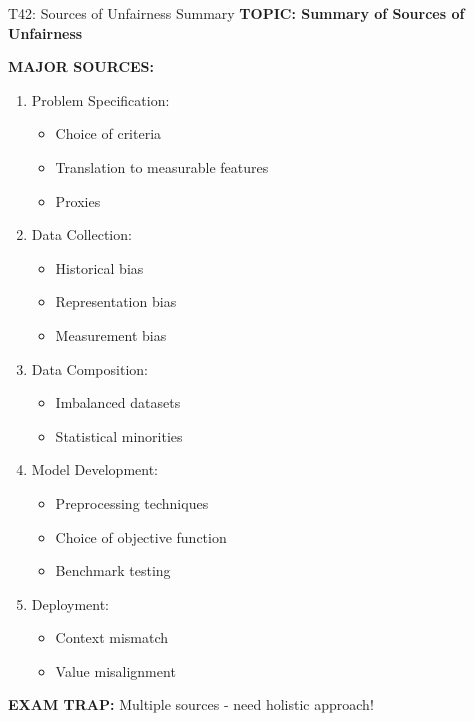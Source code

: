 \documentclass[8pt]{beamer}
\begin{document}
	\begin{frame}{T42: Sources of Unfairness Summary}
		\fontsize{6.5}{7.5}\selectfont
		\textbf{TOPIC: Summary of Sources of Unfairness}
		
		\vspace{0.1cm}
		\textbf{MAJOR SOURCES:}
		\begin{enumerate}
			\item \textcolor{myblue}{Problem Specification:}
			\begin{itemize}
				\item Choice of criteria
				\item Translation to measurable features
				\item Proxies
			\end{itemize}
			\item \textcolor{myblue}{Data Collection:}
			\begin{itemize}
				\item Historical bias
				\item Representation bias
				\item Measurement bias
			\end{itemize}
			\item \textcolor{myblue}{Data Composition:}
			\begin{itemize}
				\item Imbalanced datasets
				\item Statistical minorities
			\end{itemize}
			\item \textcolor{myblue}{Model Development:}
			\begin{itemize}
				\item Preprocessing techniques
				\item Choice of objective function
				\item Benchmark testing
			\end{itemize}
			\item \textcolor{myblue}{Deployment:}
			\begin{itemize}
				\item Context mismatch
				\item Value misalignment
			\end{itemize}
		\end{enumerate}
		
		\textcolor{myred}{\textbf{EXAM TRAP:}} Multiple sources - need \textcolor{myblue}{holistic approach}!
	\end{frame}
	
	
\end{document}
